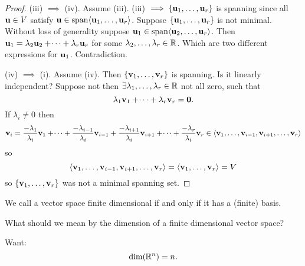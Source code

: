 \documentclass[10pt, a4paper]{article}
\begin{document}
\begin{theorem}
\begin{proof}
        (iii) $\implies$ (iv).
        Assume (iii).
        (iii) $\implies \{\mathbf{u}_1, \dotsc, \mathbf{u}_r\}$ is spanning since all $\mathbf{u} \in V$ satisfy $\mathbf{u} \in \mathrm{span}\langle\mathbf{u}_1, \dotsc, \mathbf{u}_r\rangle$.
        Suppose $\{\mathbf{u}_1, \dotsc, \mathbf{u}_r\}$ is not minimal.
        Without loss of generality suppose $\mathbf{u}_1 \in \mathrm{span}\langle\mathbf{u}_2, \dotsc, \mathbf{u}_r\rangle$.
        Then $\mathbf{u}_1 = \lambda_2\mathbf{u}_2 + \dotsi + \lambda_r\mathbf{u}_r$ for some $\lambda_2, \dotsc, \lambda_r \in \mathbb{R}$.
        Which are two different expressions for $\mathbf{u}_1$.
        Contradiction.

        (iv) $\implies$ (i).
        Assume (iv).
        Then $\{\mathbf{v}_1, \dotsc, \mathbf{v}_r\}$ is spanning.
        Is it linearly independent?
        Suppose not then $\exists\lambda_1, \dotsc, \lambda_r \in \mathbb{R}$ not all zero,
        such that
        \[
        \lambda_1\mathbf{v}_1 + \dotsi + \lambda_r\mathbf{v}_r = \mathbf{0}.
        \]
        If $\lambda_i \neq 0$ then
        \[
        \mathbf{v}_i = \frac{-\lambda_1}{\lambda_i}\mathbf{v}_1 + \dotsi + \frac{-\lambda_{i - 1}}{\lambda_i}\mathbf{v}_{i - 1} + \frac{-\lambda_{i + 1}}{\lambda_i}\mathbf{v}_{i + 1} + \dotsi + \frac{-\lambda_r}{\lambda_i}\mathbf{v}_r \in \langle\mathbf{v}_1, \dotsc, \mathbf{v}_{i - 1}, \mathbf{v}_{i + 1}, \dotsc, \mathbf{v}_r\rangle
        \]
        so
        \[
        \langle\mathbf{v}_1, \dotsc, \mathbf{v}_{i - 1}, \mathbf{v}_{i + 1}, \dotsc, \mathbf{v}_r\rangle = \langle\mathbf{v}_1, \dotsc, \mathbf{v}_r\rangle = V
        \]
        so $\{\mathbf{v}_1, \dotsc, \mathbf{v}_r\}$ was not a minimal spanning set.
        
    \end{proof}
\end{theorem}

\begin{definition}
    We call a vector space finite dimensional if and only if it has a
    (finite)
    basis.
\end{definition}

What should we mean by the dimension of a finite dimensional vector space?

Want:
\[
\dim(\mathbb{R} ^ n) = n.
\]
\end{document}
